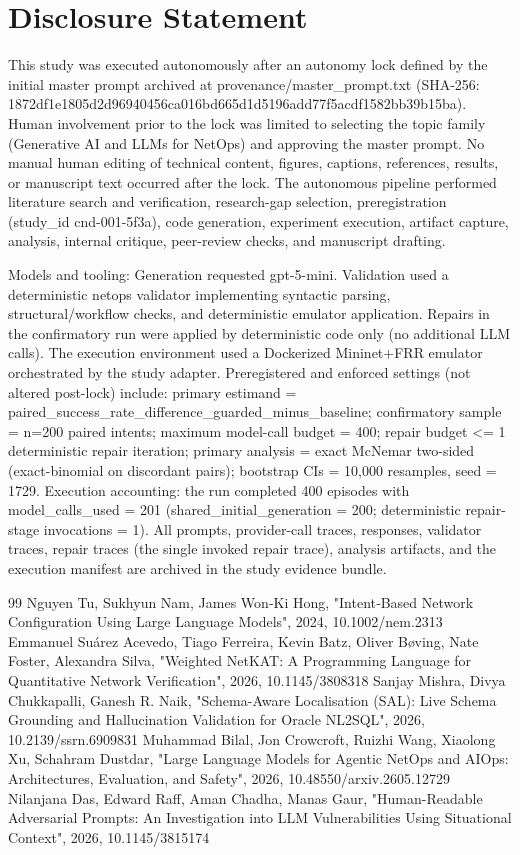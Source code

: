 \documentclass[conference]{IEEEtran}
\begin{document}
\section*{Disclosure Statement}
This study was executed autonomously after an autonomy lock defined by the initial master prompt archived at provenance/master\_prompt.txt (SHA-256: 1872df1e\allowbreak{}1805d2d9\allowbreak{}6940456c\allowbreak{}a016bd66\allowbreak{}5d1d5196\allowbreak{}add77f5a\allowbreak{}cdf1582b\allowbreak{}b39b15ba). Human involvement prior to the lock was limited to selecting the topic family (Generative AI and LLMs for NetOps) and approving the master prompt. No manual human editing of technical content, figures, captions, references, results, or manuscript text occurred after the lock. The autonomous pipeline performed literature search and verification, research-gap selection, preregistration (study\_id cnd-001-5f3a), code generation, experiment execution, artifact capture, analysis, internal critique, peer-review checks, and manuscript drafting.

Models and tooling: Generation requested gpt-5-mini. Validation used a deterministic netops validator implementing syntactic parsing, structural/workflow checks, and deterministic emulator application. Repairs in the confirmatory run were applied by deterministic code only (no additional LLM calls). The execution environment used a Dockerized Mininet+FRR emulator orchestrated by the study adapter. Preregistered and enforced settings (not altered post-lock) include: primary estimand = paired\_success\_rate\_difference\_guarded\_minus\_baseline; confirmatory sample = n=200 paired intents; maximum model-call budget = 400; repair budget <= 1 deterministic repair iteration; primary analysis = exact McNemar two-sided (exact-binomial on discordant pairs); bootstrap CIs = 10,000 resamples, seed = 1729. Execution accounting: the run completed 400 episodes with model\_calls\_used = 201 (shared\_initial\_generation = 200; deterministic repair-stage invocations = 1). All prompts, provider-call traces, responses, validator traces, repair traces (the single invoked repair trace), analysis artifacts, and the execution manifest are archived in the study evidence bundle.

\begin{thebibliography}{99}
 Nguyen Tu, Sukhyun Nam, James Won‐Ki Hong, "Intent‐Based Network Configuration Using Large Language Models", 2024, 10.1002/nem.2313
 Emmanuel Suárez Acevedo, Tiago Ferreira, Kevin Batz, Oliver Bøving, Nate Foster, Alexandra Silva, "Weighted NetKAT: A Programming Language for Quantitative Network Verification", 2026, 10.1145/3808318
 Sanjay Mishra, Divya Chukkapalli, Ganesh R. Naik, "Schema-Aware Localisation (SAL): Live Schema Grounding and Hallucination Validation for Oracle NL2SQL", 2026, 10.2139/ssrn.6909831
 Muhammad Bilal, Jon Crowcroft, Ruizhi Wang, Xiaolong Xu, Schahram Dustdar, "Large Language Models for Agentic NetOps and AIOps: Architectures, Evaluation, and Safety", 2026, 10.48550/arxiv.2605.12729
 Nilanjana Das, Edward Raff, Aman Chadha, Manas Gaur, "Human-Readable Adversarial Prompts: An Investigation into LLM Vulnerabilities Using Situational Context", 2026, 10.1145/3815174
\end{thebibliography}
\end{document}
